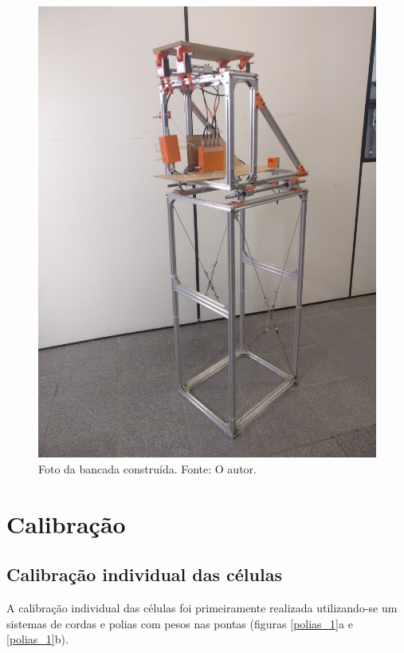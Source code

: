 \begin{figure}[!ht]
    \centering
    \includegraphics[width=.7\linewidth]{figuras/calibracao/bancada_completa.jpg}
    \caption{Foto da bancada construída. Fonte: O autor.}
    \label{fig:bancada_construida}
\end{figure}

\section{Calibração}

\subsection{Calibração individual das células}
A calibração individual das células foi primeiramente realizada utilizando-se um sistemas de cordas e polias com pesos nas pontas (figuras \ref{polias_1}a e \ref{polias_1}b).

